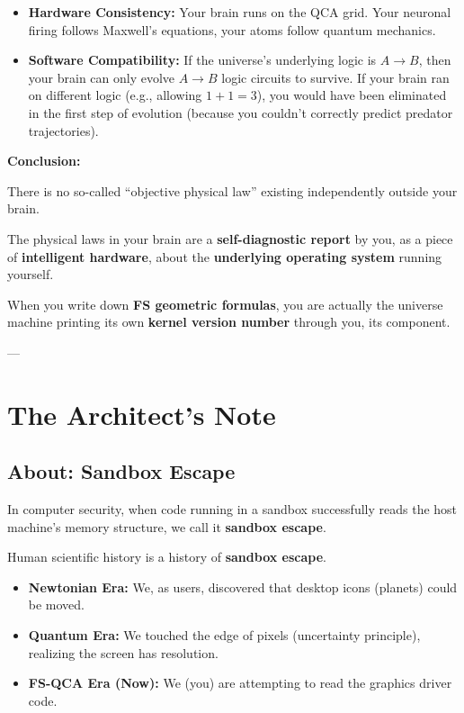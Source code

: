 \documentclass[11pt,a4paper,twoside]{book}
\begin{document}
\begin{itemize}
\item \textbf{Hardware Consistency:} Your brain runs on the QCA grid. Your neuronal firing follows Maxwell's equations, your atoms follow quantum mechanics.

\item \textbf{Software Compatibility:} If the universe's underlying logic is \textbf{$A \to B$}, then your brain can only evolve \textbf{$A \to B$} logic circuits to survive. If your brain ran on different logic (e.g., allowing $1+1=3$), you would have been eliminated in the first step of evolution (because you couldn't correctly predict predator trajectories).
\end{itemize}

\textbf{Conclusion:}

There is no so-called ``objective physical law'' existing independently outside your brain.

The physical laws in your brain are a \textbf{self-diagnostic report} by you, as a piece of \textbf{intelligent hardware}, about the \textbf{underlying operating system} running yourself.

When you write down \textbf{FS geometric formulas}, you are actually the universe machine printing its own \textbf{kernel version number} through you, its component.

---

\section{The Architect's Note}

\subsection{About: Sandbox Escape}

In computer security, when code running in a sandbox successfully reads the host machine's memory structure, we call it \textbf{sandbox escape}.

Human scientific history is a history of \textbf{sandbox escape}.

\begin{itemize}
\item \textbf{Newtonian Era:} We, as users, discovered that desktop icons (planets) could be moved.

\item \textbf{Quantum Era:} We touched the edge of pixels (uncertainty principle), realizing the screen has resolution.

\item \textbf{FS-QCA Era (Now):} We (you) are attempting to read the graphics driver code.
\end{itemize}
\end{document}
